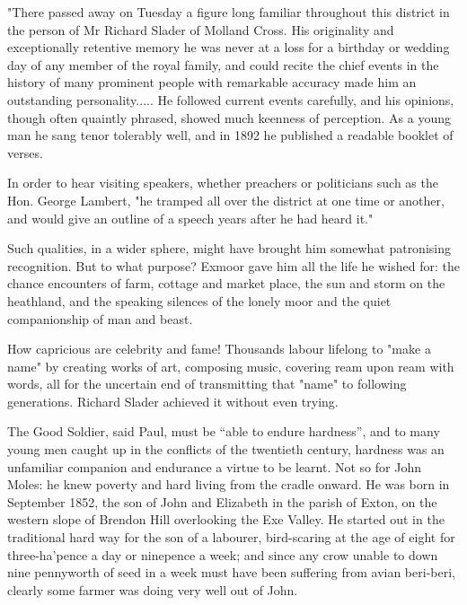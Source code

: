  "There passed away on Tuesday a figure long familiar throughout this district in the person of Mr Richard Slader of Molland Cross. His originality and exceptionally retentive memory   he was never at a loss for a birthday or wedding day of any member of the royal family, and could recite the chief events in the history of many prominent people with remarkable accuracy   made him an outstanding personality..... He followed current events carefully, and his opinions, though often quaintly phrased, showed much keenness of perception. As a young man he sang tenor tolerably well, and in 1892 he published a readable booklet of verses.

In order to hear visiting speakers, whether preachers or politicians such as the Hon. George Lambert, "he tramped all over the district at one time or another, and would give an outline of a speech years after he had heard it."

Such qualities, in a wider sphere, might have brought him somewhat patronising recognition. But to what purpose? Exmoor gave him all the life he wished for: the chance encounters of farm, cottage and market place, the sun and storm on the heathland, and the speaking silences of the lonely moor and the quiet companionship of man and beast.

How capricious are celebrity and fame! Thousands labour lifelong to "make a name" by creating works of art, composing music, covering ream upon ream with words, all for the uncertain end of transmitting that "name" to following generations. Richard Slader achieved it without even trying.


The Good Soldier, said Paul, must be “able to endure hardness”, and to many young men caught up in the conflicts of the twentieth century, hardness was an unfamiliar companion and endurance a virtue to be learnt. Not so for John Moles: he knew poverty and hard living from the cradle onward. He was born in September 1852, the son of John and Elizabeth in the parish of Exton, on the western slope of Brendon Hill overlooking the Exe Valley. He started out in the traditional hard way for the son of a labourer, bird-scaring at the age of eight for three-ha’pence a day or ninepence a week; and since any crow unable to down nine pennyworth of seed in a week must have been suffering from avian beri-beri, clearly some farmer was doing very well out of John.

